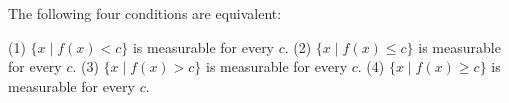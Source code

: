 The following four conditions are equivalent:

(1) $\{x \mid f(x) < c\}$ is measurable for every $c$.
(2) $\{x \mid f(x) \leq c\}$ is measurable for every $c$.
(3) $\{x \mid f(x) > c\}$ is measurable for every $c$.
(4) $\{x \mid f(x) \geq c\}$ is measurable for every $c$.
